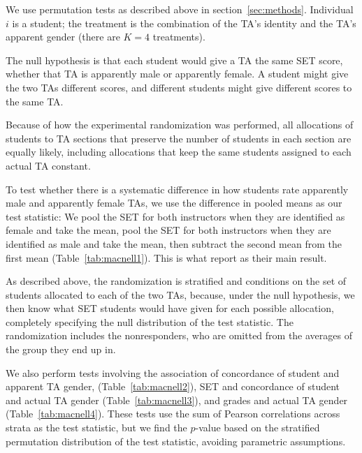 \documentclass[12pt]{article}
\begin{document}
We use permutation tests as described above in section~\ref{sec:methods}.
Individual $i$ is a student; the treatment is the combination of the TA's identity and the TA's
apparent gender (there are $K=4$ treatments).

The null hypothesis is that each student would give a TA the same SET score,
whether that TA is apparently male or apparently female.
A student might give the two TAs different scores,
and different students might give different scores to the same TA. 

Because of how the experimental randomization was performed, all allocations of students to 
TA sections that preserve the number of students in each section are equally likely,  
including allocations that keep the same students assigned to each actual TA constant.

To test whether there is a systematic difference in how students rate apparently male and 
apparently female TAs, we use the difference in pooled means as our test statistic:
We pool the SET for both instructors when they are identified as female
and take the mean, pool the SET for both instructors when they are identified as male
and take the mean, then subtract the second mean from the first mean
(Table~\ref{tab:macnell1}).
This is what \cite{MacNell2014} report as their main result.

As described above, the randomization is stratified and conditions on the set of students 
allocated to each of the two TAs, because, under the null hypothesis, we then know what 
SET students would have given for each possible allocation, completely specifying the
null distribution of the test statistic.
The randomization includes the nonresponders, who are omitted from the averages of the
group they end up in.

We also perform tests involving the association of concordance of student and apparent 
TA gender,
(Table~\ref{tab:macnell2}), SET and concordance of student and actual TA gender 
(Table~\ref{tab:macnell3}), and grades and actual TA gender (Table~\ref{tab:macnell4}).  
These tests use the sum of Pearson correlations across strata as the test statistic, 
but we find the $p$-value
based on the stratified permutation distribution of the test statistic, avoiding
parametric assumptions.
\end{document}
